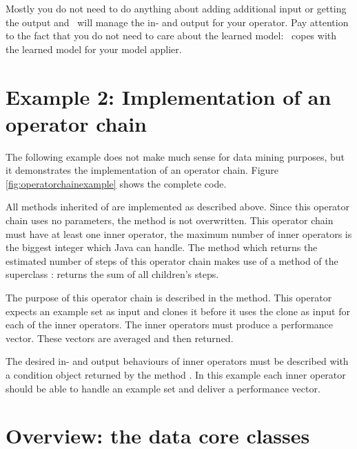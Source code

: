 
Mostly you do not need to do anything about adding additional input or
getting the output and \rapidminer\ will manage the in- and output for your
operator. Pay attention to the fact that you do not need to care about the
learned model: \rapidminer\ copes with the learned model for your model applier.




\section{Example 2: Implementation of an operator chain}
\label{sec:operatorchainexample}

The following example does not make much sense for data mining purposes, but
it demonstrates the implementation of an operator chain. Figure
\ref{fig:operatorchainexample} shows the complete code.


All methods inherited of  are implemented as described
above. Since this operator chain uses no parameters, the method
 is not overwritten. This operator chain must have
at least one inner operator, the maximum number of inner operators is the
biggest integer which Java can handle. The method which returns the estimated
number of steps of this operator chain makes use of a method of the superclass
:  returns the sum of all
children's steps. 

The purpose of this operator chain is described in the 
method. This operator expects an example set as input and clones it before it
uses the clone as input for each of the inner operators. The inner operators
must produce a performance vector. These vectors are averaged and then
returned.

The desired in- and output behaviours of inner operators must be described
with a condition object returned by the method
. In this example each inner operator should
be able to handle an example set and deliver a performance vector.






\section{Overview: the data core classes}
\label{sec:data_core}

